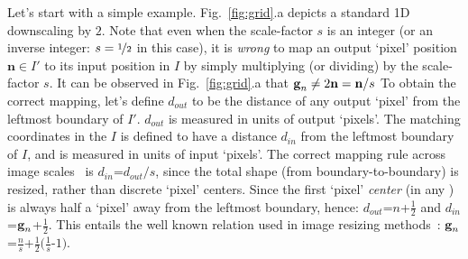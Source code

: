 Let's start with a simple example. Fig.~\ref{fig:grid}.a depicts a standard 1D  downscaling by %
$2$. Note that even when the scale-factor $s$ is an integer (or an inverse integer: ${s=\textcolor{black}{\nicefrac{1}{2}}}$ in this case), it is  \emph{wrong} to map an output `pixel' position $\textbf{n}$$\in$$I'$  to its input position in $I$ by simply multiplying (or dividing)  by the scale-factor $s$. It can be observed in Fig.~\ref{fig:grid}.a   that ${\textcolor{black}{\textbf{g}_n}\neq2\textbf{n}=\textbf{n}}/{s}$
To obtain the correct mapping, let's
define $d_{out}$  to be the distance of any output `pixel'  
from the leftmost boundary of $I'$.  $d_{out}$  is measured in units of output `pixels'. The matching coordinates    in the  $I$  is  defined to have a distance $d_{in}$ from the leftmost boundary of  $I$, and is measured in units of input `pixels'. The correct mapping rule across image scales~\cite{MATLAB:2010} is $d_{in}$=${d_{out}}/{s}$, 
since the total shape (from boundary-to-boundary) is resized, rather than discrete `pixel' centers. Since the first `pixel' \emph{center} (in any ) is always half a `pixel' away from the leftmost boundary, hence:
$d_{out}$=$n$+$\frac{1}{2}$  and  $d_{in}$=$\textcolor{black}{\textbf{g}_n}$+$\frac{1}{2}$.
This entails the
well known relation used in image resizing methods~\cite{MATLAB:2010}: 
$ \textcolor{black}{\textbf{g}_n}$=$\frac{n}{s}$+$\frac{1}{2}$$(\frac{1}{s}$-$1).$

